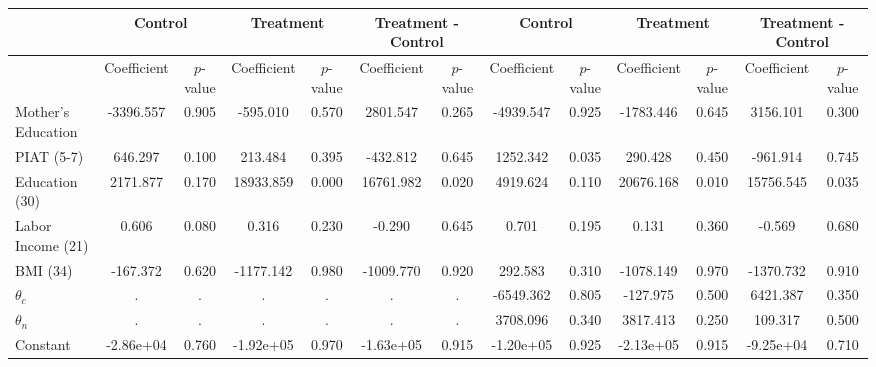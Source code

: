 \begin{tabular}{lcccccccccccc} \toprule
&\multicolumn{2}{c}{Control} & \multicolumn{2}{c}{Treatment} & \multicolumn{2}{c}{Treatment - Control} & \multicolumn{2}{c}{Control} & \multicolumn{2}{c}{Treatment} & \multicolumn{2}{c}{Treatment - Control} \\ \midrule
 & Coefficient  & $p$-value  & Coefficient  & $p$-value & Coefficient  & $p$-value  & Coefficient  & $p$-value  & Coefficient  & $p$-value  & Coefficient  & $p$-value \\ \midrule
Mother's Education & -3396.557 &     0.905 &  -595.010 &     0.570 &  2801.547 &     0.265 & -4939.547 &     0.925 & -1783.446 &     0.645 &  3156.101 &     0.300 \\  
PIAT (5-7)&   646.297 &     0.100 &   213.484 &     0.395 &  -432.812 &     0.645 &  1252.342 &     0.035 &   290.428 &     0.450 &  -961.914 &     0.745 \\  
Education (30) &  2171.877 &     0.170 & 18933.859 &     0.000 & 16761.982 &     0.020 &  4919.624 &     0.110 & 20676.168 &     0.010 & 15756.545 &     0.035 \\  
Labor Income (21) &     0.606 &     0.080 &     0.316 &     0.230 &    -0.290 &     0.645 &     0.701 &     0.195 &     0.131 &     0.360 &    -0.569 &     0.680 \\  
BMI (34)  &  -167.372 &     0.620 & -1177.142 &     0.980 & -1009.770 &     0.920 &   292.583 &     0.310 & -1078.149 &     0.970 & -1370.732 &     0.910 \\  
$\theta_{c}$ &         . &         . &         . &         . &         . &         . & -6549.362 &     0.805 &  -127.975 &     0.500 &  6421.387 &     0.350 \\  
$\theta_{n}$ &         . &         . &         . &         . &         . &         . &  3708.096 &     0.340 &  3817.413 &     0.250 &   109.317 &     0.500 \\  
Constant & -2.86e+04 &     0.760 & -1.92e+05 &     0.970 & -1.63e+05 &     0.915 & -1.20e+05 &     0.925 & -2.13e+05 &     0.915 & -9.25e+04 &     0.710 \\  
\hline \hline \end{tabular}
